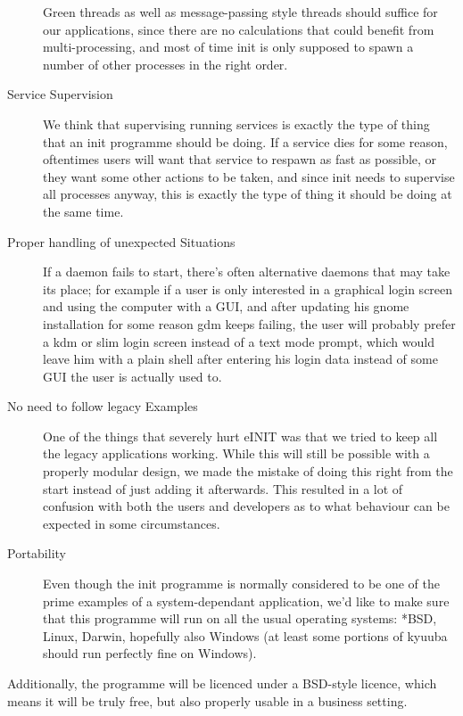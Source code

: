 \documentclass[a4paper,twoside,titlepage]{article}
\begin{document}
\begin{description}
Green threads as well as message-passing style threads should suffice for our
applications, since there are no calculations that could benefit from
multi-processing, and most of time init is only supposed to spawn a number of
other processes in the right order.

\item[Service Supervision]
We think that supervising running services is exactly the type of thing that an
init programme should be doing. If a service dies for some reason, oftentimes
users will want that service to respawn as fast as possible, or they want some
other actions to be taken, and since init needs to supervise all processes
anyway, this is exactly the type of thing it should be doing at the same time.

\item[Proper handling of unexpected Situations]
If a daemon fails to start, there's often alternative daemons that may take its
place; for example if a user is only interested in a graphical login screen and
using the computer with a GUI, and after updating his gnome installation for
some reason gdm keeps failing, the user will probably prefer a kdm or slim login
screen instead of a text mode prompt, which would leave him with a plain shell
after entering his login data instead of some GUI the user is actually used to.

\item[No need to follow legacy Examples]
One of the things that severely hurt eINIT was that we tried to keep all the
legacy applications working. While this will still be possible with a properly
modular design, we made the mistake of doing this right from the start instead
of just adding it afterwards. This resulted in a lot of confusion with both the
users and developers as to what behaviour can be expected in some circumstances.

\item[Portability]
Even though the init programme is normally considered to be one of the prime
examples of a system-dependant application, we'd like to make sure that this
programme will run on all the usual operating systems: *BSD, Linux, Darwin,
hopefully also Windows (at least some portions of kyuuba should run perfectly
fine on Windows).

\end{description}

Additionally, the programme will be licenced under a BSD-style licence, which
means it will be truly free, but also properly usable in a business setting.
\end{document}
